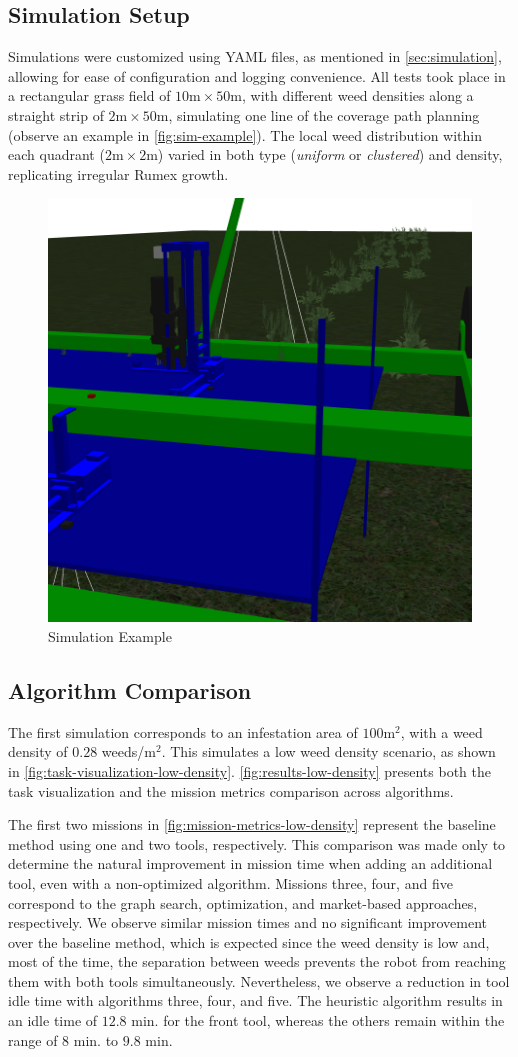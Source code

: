 \subsection{Simulation Setup}
Simulations were customized using YAML files, as mentioned in \autoref{sec:simulation}, allowing for ease of configuration and logging convenience. All tests took place in a rectangular grass field of $10\text{m} \times 50\text{m}$, with different weed densities along a straight strip of $2\text{m} \times 50\text{m}$, simulating one line of the coverage path planning (observe an example in \autoref{fig:sim-example}). The local weed distribution within each quadrant ($2\text{m} \times 2\text{m}$) varied in both type (\textit{uniform} or \textit{clustered}) and density, replicating irregular Rumex growth. 

\begin{figure}[hbt]
    \centering
    \includegraphics[width=0.5\linewidth]{gfx/ch03/field_strip_path_2.png}
    \caption{Simulation Example}
    \label{fig:sim-example}
\end{figure}

\subsection{Algorithm Comparison}
The first simulation corresponds to an infestation area of $100\text{m}^2$, with a weed density of $0.28$ weeds/m$^2$. This simulates a low weed density scenario, as shown in \autoref{fig:task-visualization-low-density}. \autoref{fig:results-low-density} presents both the task visualization and the mission metrics comparison across algorithms. 

The first two missions in \autoref{fig:mission-metrics-low-density} represent the baseline method using one and two tools, respectively. This comparison was made only to determine the natural improvement in mission time when adding an additional tool, even with a non-optimized algorithm. Missions three, four, and five correspond to the graph search, optimization, and market-based approaches, respectively. We observe similar mission times and no significant improvement over the baseline method, which is expected since the weed density is low and, most of the time, the separation between weeds prevents the robot from reaching them with both tools simultaneously. Nevertheless, we observe a reduction in tool idle time with algorithms three, four, and five. The heuristic algorithm results in an idle time of $12.8$ min. for the front tool, whereas the others remain within the range of $8$ min. to $9.8$ min.

